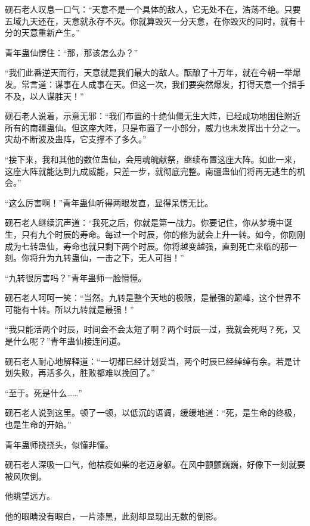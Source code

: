 
\begin{this_body}



砚石老人叹息一口气：“天意不是一个具体的敌人，它无处不在，浩荡不绝。只要五域九天还在，天意就永存不灭。你就算毁灭一分天意，在你毁灭的同时，就有十分的天意重新产生。”

青年蛊仙愣住：“那，那该怎么办？”

“我们此番逆天而行，天意就是我们最大的敌人。酝酿了十万年，就在今朝一举爆发。常言道：谋事在人成事在天。但这一次，我们要突然爆发，打得天意一个措手不及，以人谋胜天！”

砚石老人说着，示意无邪：“我们布置的十绝仙僵无生大阵，已经成功地困住附近所有的南疆蛊仙。但这座大阵，只是布置了一小部分，威力也未发挥出十分之一。灾劫不断波及蛊阵，它支撑不了多久。”

“接下来，我和其他的数位蛊仙，会用魂魄献祭，继续布置这座大阵。如此一来，这座大阵就能达到九成威能，只差一步，就彻底完整。南疆蛊仙们将再无逃生的机会。”

“这么厉害啊！”青年蛊仙听得两眼发直，显得呆愣无比。

砚石老人继续沉声道：“我死之后，你就是第一战力。你要记住，你从梦境中诞生，只有九个时辰的寿命。每过一个时辰，你的修为就会上升一转。如今，你刚刚成为七转蛊仙，寿命也就只剩下两个时辰。你将越变越强，直到死亡来临的那一刻。你将升为九转蛊仙，一击之下，无人可挡！”

“九转很厉害吗？”青年蛊师一脸懵懂。

砚石老人呵呵一笑：“当然。九转是整个天地的极限，是最强的巅峰，这个世界不可能有十转。所以九转就是最强！”

“我只能活两个时辰，时间会不会太短了啊？两个时辰一过，我就会死吗？死，又是什么呢？”青年蛊仙接连问道。

砚石老人耐心地解释道：“一切都已经计划妥当，两个时辰已经绰绰有余。若是计划失败，再活多久，胜败都难以挽回了。”

“至于。死是什么……”

砚石老人说到这里。顿了一顿，以低沉的语调，缓缓地道：“死，是生命的终极，也是生命的开始。”

青年蛊师挠挠头，似懂非懂。

砚石老人深吸一口气，他枯瘦如柴的老迈身躯。在风中颤颤巍巍，好像下一刻就要被风吹倒。

他眺望远方。

他的眼睛没有眼白，一片漆黑，此刻却显现出无数的倒影。


\end{this_body}
